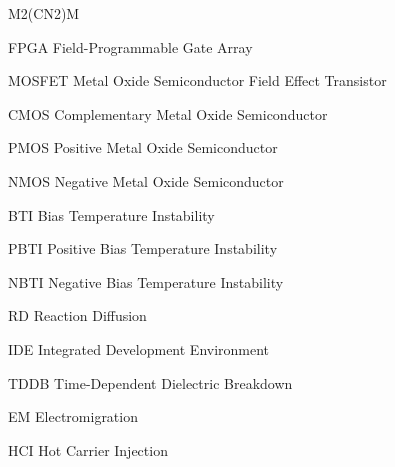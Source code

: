 \begin{listofabbrv}{M2(CN2)M}
        \item[FPGA] Field-Programmable Gate Array
        \item[MOSFET] Metal Oxide Semiconductor Field Effect Transistor
        \item[CMOS] Complementary Metal Oxide Semiconductor
        \item[PMOS] Positive Metal Oxide Semiconductor
        \item[NMOS] Negative Metal Oxide Semiconductor
        \item[BTI] Bias Temperature Instability
        \item[PBTI] Positive Bias Temperature Instability
        \item[NBTI] Negative Bias Temperature Instability
        \item[RD] Reaction Diffusion
        \item[IDE] Integrated Development Environment
        \item[TDDB] Time-Dependent Dielectric Breakdown
        \item[EM] Electromigration
        \item[HCI] Hot Carrier Injection
\end{listofabbrv}